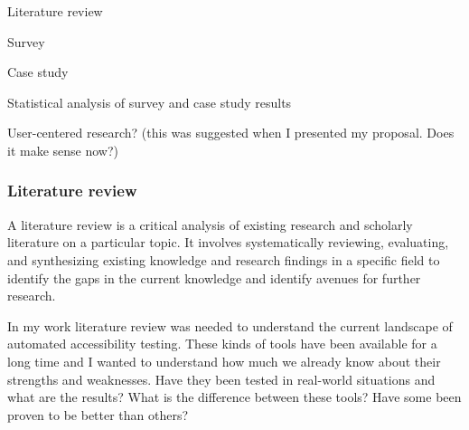 \documentclass{master_thesis}
\begin{document}



\begin{list}{-}{}
	\item Literature review
	\item Survey
	\item Case study
	\item Statistical analysis of survey and case study results
	\item User-centered research? (this was suggested when I presented my proposal. Does it make sense now?)
\end{list}

\subsubsection{Literature review}

A literature review is a critical analysis of existing research and scholarly literature on a particular topic. It involves systematically reviewing, evaluating, and synthesizing existing knowledge and research findings in a specific field to identify the gaps in the current knowledge and identify avenues for further research. 



In my work literature review was needed to understand the current landscape of automated accessibility testing. These kinds of tools have been available for a long time and I wanted to understand how much we already know about their strengths and weaknesses. Have they been tested in real-world situations and what are the results? What is the difference between these tools? Have some been proven to be better than others?


\end{document}
